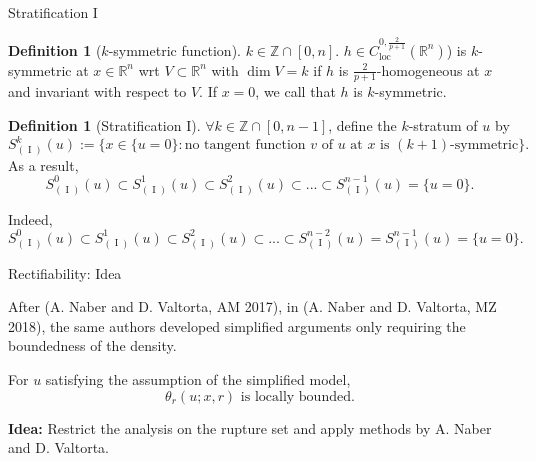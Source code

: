 \documentclass[11pt]{beamer}
\newcommand{\Z}{\mathbb{Z}}
\newcommand{\R}{\mathbb{R}}
\newcommand{\f}{\frac}
\newcommand{\op}{\operatorname}
\DeclareMathOperator{\loc}{loc}
\theoremstyle{plain}
\theoremstyle{definition}
\newtheorem{defn}[thm]{Definition}
\begin{document}
\begin{frame}{Stratification I}

\begin{defn}[$ k $-symmetric function]\label{ksymmetryf}
$ k\in\Z\cap[0,n] $. $ h\in C_{\loc}^{0,\f{2}{p+1}}(\R^n) $) is $ k $-symmetric at $ x\in\R^n $ wrt $ V\subset\R^n $ with $ \dim V=k $ if $ h $ is $ \f{2}{p+1} $-homogeneous at $ x $ and invariant with respect to $ V $. If $ x=0 $, we call that $ h $ is $ k $-symmetric.\pause
\end{defn}

\begin{defn}[Stratification I]
$ \forall k\in\Z\cap[0,n-1] $, define the $ k $-stratum of $ u $ by
$$
S_{(\op{I})}^k(u):=\{x\in\{u=0\}:\text{no tangent function }v\text{ of }u\text{ at }x\text{ is }(k+1)\text{-symmetric}\}.
$$
As a result,
$$
S_{(\op{I})}^0(u)\subset S_{(\op{I})}^1(u)\subset S_{(\op{I})}^2(u)\subset...\subset S_{(\op{I})}^{n-1}(u)=\{u=0\}.
$$
\end{defn}\pause

Indeed,
$$
S_{(\op{I})}^0(u)\subset S_{(\op{I})}^1(u)\subset S_{(\op{I})}^2(u)\subset...\subset S_{(\op{I})}^{n-2}(u)=S_{(\op{I})}^{n-1}(u)=\{u=0\}.
$$
\end{frame}



\begin{frame}{Rectifiability: Idea}

After (A. Naber and D. Valtorta, AM 2017), in (A. Naber and D. Valtorta, MZ 2018), the same authors developed simplified arguments only requiring the boundedness of the density.

\vspace{1em}

For $ u $ satisfying the assumption of the simplified model,
$$
\theta_r(u;x,r)\text{ is locally bounded}.
$$
\pause


\textbf{Idea:} Restrict the analysis on the rupture set and apply methods by A. Naber and D. Valtorta.

\end{frame}
\end{document}
